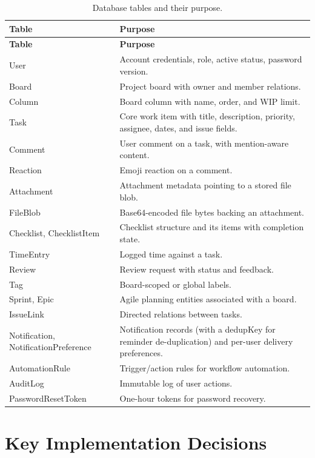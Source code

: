\documentclass[12pt,a4paper]{report}
\begin{document}
\begin{longtable}{|p{5.5cm}|p{10.5cm}|}
\caption{Database tables and their purpose.}\\
\hline
\textbf{Table} & \textbf{Purpose} \\
\hline
\endfirsthead
\hline
\textbf{Table} & \textbf{Purpose} \\
\hline
\endhead
\hline
\endlastfoot
User & Account credentials, role, active status, password version. \\
\hline
Board & Project board with owner and member relations. \\
\hline
Column & Board column with name, order, and WIP limit. \\
\hline
Task & Core work item with title, description, priority, assignee, dates, and
issue fields. \\
\hline
Comment & User comment on a task, with mention-aware content. \\
\hline
Reaction & Emoji reaction on a comment. \\
\hline
Attachment & Attachment metadata pointing to a stored file blob. \\
\hline
FileBlob & Base64-encoded file bytes backing an attachment. \\
\hline
Checklist, ChecklistItem & Checklist structure and its items with completion
state. \\
\hline
TimeEntry & Logged time against a task. \\
\hline
Review & Review request with status and feedback. \\
\hline
Tag & Board-scoped or global labels. \\
\hline
Sprint, Epic & Agile planning entities associated with a board. \\
\hline
IssueLink & Directed relations between tasks. \\
\hline
Notification, NotificationPreference & Notification records (with a dedupKey
for reminder de-duplication) and per-user delivery preferences. \\
\hline
AutomationRule & Trigger/action rules for workflow automation. \\
\hline
AuditLog & Immutable log of user actions. \\
\hline
PasswordResetToken & One-hour tokens for password recovery. \\
\hline
\end{longtable}

\section{Key Implementation Decisions}
\end{document}
